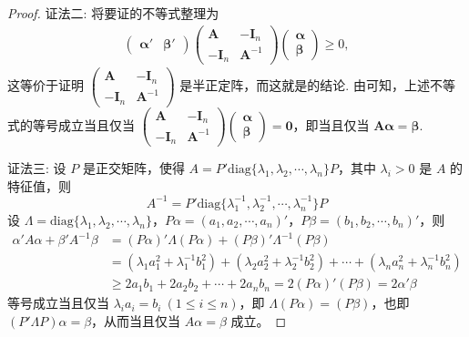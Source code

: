 \documentclass[../../main.tex]{subfiles}%
\begin{document}
\begin{proof}
{\color{blue}证法二:}
将要证的不等式整理为
\begin{align*}
\begin{pmatrix}
\boldsymbol{\alpha}' & \boldsymbol{\beta}'
\end{pmatrix}
\begin{pmatrix}
\boldsymbol{A} & -\boldsymbol{I}_n \\
-\boldsymbol{I}_n & \boldsymbol{A}^{-1}
\end{pmatrix}
\begin{pmatrix}
\boldsymbol{\alpha} \\
\boldsymbol{\beta}
\end{pmatrix} \geqslant  0,
\end{align*}
这等价于证明 $\begin{pmatrix}
\boldsymbol{A} & -\boldsymbol{I}_n \\
-\boldsymbol{I}_n & \boldsymbol{A}^{-1}
\end{pmatrix}$ 是半正定阵，而这就是的结论. 由可知，上述不等式的等号成立当且仅当 $\begin{pmatrix}
\boldsymbol{A} & -\boldsymbol{I}_n \\
-\boldsymbol{I}_n & \boldsymbol{A}^{-1}
\end{pmatrix}
\begin{pmatrix}
\boldsymbol{\alpha} \\
\boldsymbol{\beta}
\end{pmatrix}=\boldsymbol{0}$，即当且仅当 $\boldsymbol{A}\boldsymbol{\alpha}=\boldsymbol{\beta}$.

{\color{blue}证法三:}
设 \(P\) 是正交矩阵，使得 \(A = P'\mathrm{diag}\{\lambda_1,\lambda_2,\cdots,\lambda_n\}P\)，其中 \(\lambda_i > 0\) 是 \(A\) 的特征值，则
\[
A^{-1} = P'\mathrm{diag}\{\lambda_1^{-1},\lambda_2^{-1},\cdots,\lambda_n^{-1}\}P
\]
设 \(\Lambda = \mathrm{diag}\{\lambda_1,\lambda_2,\cdots,\lambda_n\}\)，\(P\alpha = (a_1,a_2,\cdots,a_n)'\)，\(P\beta = (b_1,b_2,\cdots,b_n)'\)，则
\begin{align*}
\alpha'A\alpha + \beta'A^{-1}\beta &= (P\alpha)'\Lambda(P\alpha) + (P\beta)'\Lambda^{-1}(P\beta)\\
&= (\lambda_1a_1^2 + \lambda_1^{-1}b_1^2) + (\lambda_2a_2^2 + \lambda_2^{-1}b_2^2) + \cdots + (\lambda_na_n^2 + \lambda_n^{-1}b_n^2)\\
&\geqslant  2a_1b_1 + 2a_2b_2 + \cdots + 2a_nb_n = 2(P\alpha)'(P\beta) = 2\alpha'\beta
\end{align*}
等号成立当且仅当 \(\lambda_ia_i = b_i\ (1\leqslant  i \leqslant  n)\)，即 \(\Lambda(P\alpha) = (P\beta)\)，也即 \((P'\Lambda P)\alpha = \beta\)，从而当且仅当 \(A\alpha = \beta\) 成立。 

\end{proof}
\end{document}
